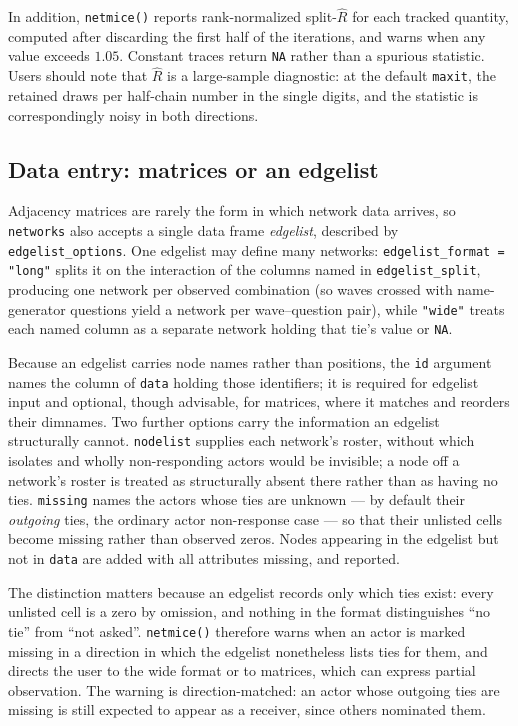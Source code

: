 \documentclass[11pt,a4paper]{article}
\newcommand{\code}[1]{\texttt{#1}}
\begin{document}
In addition, \code{netmice()} reports rank-normalized split-$\widehat{R}$
\citep{GelmanRubin1992,Vehtari2021} for each tracked quantity, computed after
discarding the first half of the iterations, and warns when any value exceeds
$1.05$. Constant traces return \code{NA} rather than a spurious statistic.
Users should note that $\widehat{R}$ is a large-sample diagnostic: at the
default \code{maxit}, the retained draws per half-chain number in the single
digits, and the statistic is correspondingly noisy in both directions.

\subsection{Data entry: matrices or an edgelist}
\label{sec:edgelist}

Adjacency matrices are rarely the form in which network data arrives, so
\code{networks} also accepts a single data frame \emph{edgelist}, described by
\code{edgelist\_options}. One edgelist may define many networks:
\code{edgelist\_format = "long"} splits it on the interaction of the columns
named in \code{edgelist\_split}, producing one network per observed
combination (so waves crossed with name-generator questions yield a network
per wave--question pair), while \code{"wide"} treats each named column as a
separate network holding that tie's value or \code{NA}.

Because an edgelist carries node names rather than positions, the \code{id}
argument names the column of \code{data} holding those identifiers; it is
required for edgelist input and optional, though advisable, for matrices,
where it matches and reorders their dimnames. Two further options carry the
information an edgelist structurally cannot. \code{nodelist} supplies each
network's roster, without which isolates and wholly non-responding actors
would be invisible; a node off a network's roster is treated as structurally
absent there rather than as having no ties. \code{missing} names the actors
whose ties are unknown --- by default their \emph{outgoing} ties, the ordinary
actor non-response case \citep{huisman2008} --- so that their unlisted cells
become missing rather than observed zeros. Nodes appearing in the edgelist but
not in \code{data} are added with all attributes missing, and reported.

The distinction matters because an edgelist records only which ties exist:
every unlisted cell is a zero by omission, and nothing in the format
distinguishes ``no tie'' from ``not asked''. \code{netmice()} therefore warns
when an actor is marked missing in a direction in which the edgelist
nonetheless lists ties for them, and directs the user to the wide format or to
matrices, which can express partial observation. The warning is
direction-matched: an actor whose outgoing ties are missing is still expected
to appear as a receiver, since others nominated them.
\end{document}
